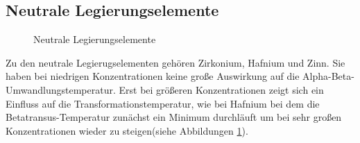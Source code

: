\documentclass[a4paper, 11pt]{tubsreprt}
\begin{document}
\subsection{Neutrale Legierungselemente}
\begin{figure}
\caption{Neutrale Legierungselemente}
\label{Abbildung neutrale legierungselemente}
\end{figure}

Zu den neutrale Legierugselementen gehören Zirkonium, Hafnium und Zinn. Sie haben bei niedrigen Konzentrationen keine große Auswirkung auf die Alpha-Beta-Umwandlungstemperatur. Erst bei größeren Konzentrationen zeigt sich ein Einfluss auf die Transformationstemperatur, wie bei Hafnium bei dem die Betatransus-Temperatur zunächst ein Minimum durchläuft um bei sehr großen Konzentrationen wieder zu steigen(siehe Abbildungen \ref{Abbildung neutrale legierungselemente}).
\end{document}
